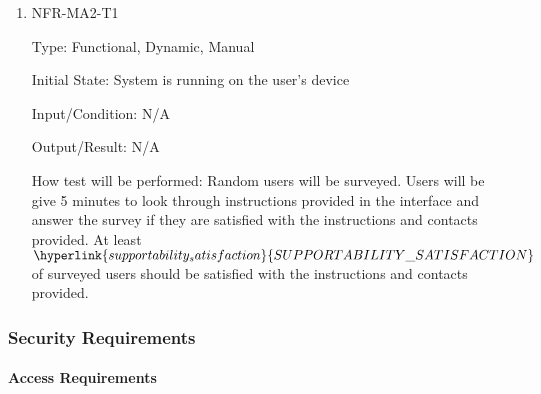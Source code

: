 \documentclass[12pt, titlepage]{article}
\begin{document}
\begin{enumerate}

\item{NFR-MA2-T1}

Type: Functional, Dynamic, Manual
					
Initial State: System is running on the user's device
					
Input/Condition: N/A
					
Output/Result: N/A
					
How test will be performed: Random users will be surveyed. Users will be give 5
minutes to look through instructions provided in the interface and answer the
survey if they are satisfied with the instructions and contacts provided. At
least\\ $\hyperlink{supportability_satisfaction}{SUPPORTABILITY\_SATISFACTION}$
of surveyed users should be satisfied with the instructions and contacts
provided.
					
\end{enumerate}

\subsubsection{Security Requirements}
\label{sec:5.2.6}
\paragraph{Access Requirements}
\end{document}
